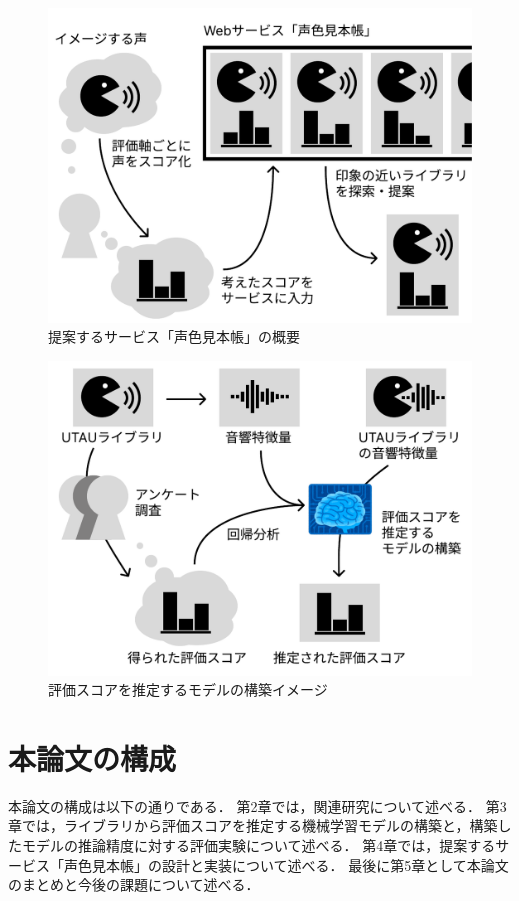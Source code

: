 \begin{figure}[h]
  \centering
  \includegraphics[width=0.9\linewidth]{fig/fig1.pdf}
  \caption{提案するサービス「声色見本帳」の概要}
  \label{fig:site_image}
\end{figure}

\begin{figure}[h]
  \centering
  \includegraphics[width=0.9\linewidth]{fig/fig2.pdf}
  \caption{評価スコアを推定するモデルの構築イメージ}
  \label{fig:site_image}
\end{figure}

\section{本論文の構成}
本論文の構成は以下の通りである．
第2章では，関連研究について述べる．
第3章では，ライブラリから評価スコアを推定する機械学習モデルの構築と，構築したモデルの推論精度に対する評価実験について述べる．
第4章では，提案するサービス「声色見本帳」の設計と実装について述べる．
最後に第5章として本論文のまとめと今後の課題について述べる．

